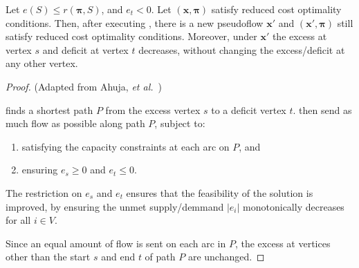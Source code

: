 \begin{lemma} \label{lemma:relax-correctness-augmentflow}
Let $e(S) \leq r(\boldsymbol{\pi},S)$, and $e_t < 0$. Let $\left(\mathbf{x},\boldsymbol{\pi}\right)$ satisfy reduced cost optimality conditions. Then, after executing , there is a new pseudoflow $\mathbf{x}'$ and $\left(\mathbf{x}',\boldsymbol{\pi}\right)$ still satisfy reduced cost optimality conditions. Moreover, under $\mathbf{x}'$ the excess at vertex $s$ and deficit at vertex $t$ decreases, without changing the excess/deficit at any other vertex.
\end{lemma}
\begin{proof} (Adapted from Ahuja, \textit{et al.}~\cite[p.~336]{Ahuja:1993})
    
 finds a shortest path $P$ from the excess vertex $s$ to a deficit vertex $t$.  then send as much flow as possible along path $P$, subject to:
\begin{enumerate}
    \item satisfying the capacity constraints at each arc on $P$, and
    \item ensuring $e_s \geq 0$ and $e_t \leq 0$.
\end{enumerate}
The restriction on $e_s$ and $e_t$ ensures that the feasibility of the solution is improved, by ensuring the unmet supply/demmand $|e_i|$ monotonically decreases for all $i \in V$\footnotemark.

Since an equal amount of flow is sent on each arc in $P$, the excess at vertices other than the start $s$ and end $t$ of path $P$ are unchanged.
\end{proof}

